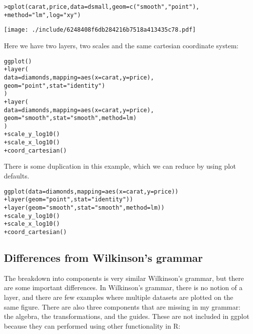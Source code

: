\begin{alltt}
> qplot(carat, price, data = dsmall, geom = c("smooth", "point"), 
+     method = "lm", log = "xy")
\end{alltt}
\texttt{[image: ./include/6248408f6db284216b7518a413435c78.pdf]}
\begin{alltt}

\end{alltt}

Here we have two layers, two scales and the same cartesian coordinate system:

\begin{alltt}
ggplot() 
+ layer(
   data=diamonds, mapping=aes(x=carat, y=price),
   geom = "point", stat = "identity")
  )
+ layer(
   data=diamonds, mapping=aes(x=carat, y=price),
   geom = "smooth", stat = "smooth", method = lm)
  )
+ scale_y_log10()
+ scale_x_log10()
+ coord_cartesian()
\end{alltt}

There is some duplication in this example, which we can reduce by using plot defaults.

\begin{alltt}
ggplot(data=diamonds, mapping=aes(x=carat, y=price)) 
+ layer(geom = "point", stat = "identity"))
+ layer(geom = "smooth", stat = "smooth", method = lm))
+ scale_y_log10()
+ scale_x_log10()
+ coord_cartesian()
\end{alltt}

\subsection{Differences from Wilkinson's grammar}

The breakdown into components is very similar Wilkinson's grammar, but there are some important differences.  In Wilkinson's grammar, there is no notion of a layer, and there are few examples where multiple datasets are plotted on the same figure.  There are also three components that are missing in my grammar: the algebra, the transformations, and the guides.  These are not included in ggplot because they can performed using other functionality in R:


